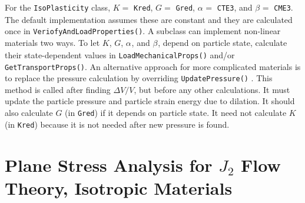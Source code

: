 \documentclass[11pt]{book}
\def\a#1{\alpha_{#1}}
\def\b#1{\beta_{#1}}
\def\code#1{{\small\tt #1}}
\begin{document}
For the \code{IsoPlasticity} class, $K=$ \code{Kred}, $G=$ \code{Gred}, $\a{}=$ \code{CTE3}, and $\b{}=$ \code{CME3}. The default implementation assumes these are constant and they are calculated once in \code{VeriofyAndLoadProperties()}. A subclass can implement non-linear materials two ways. To let $K$, $G$, $\a{}$, and $\b{}$, depend on particle state, calculate their state-dependent values in \code{LoadMechanicalProps()} and/or \code{GetTransportProps()}. An alternative approach for more complicated materials is to replace the pressure calculation by overriding \code{UpdatePressure()} . This method is called after finding ${\Delta V/V}$, but before any other calculations. It must update the particle pressure and particle strain energy due to dilation. It should also calculate $G$ (in \code{Gred}) if it depends on particle state. It need not calculate $K$ (in \code{Kred}) because it is not needed after new pressure is found. 

\section{Plane Stress Analysis for $J_2$ Flow Theory, Isotropic Materials\label{J2PStress}}
\end{document}
